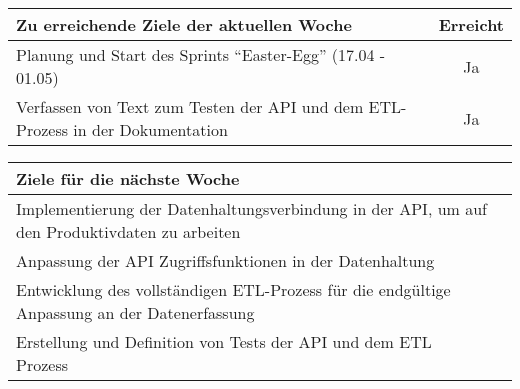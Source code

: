 \begin{tabularx}{\textwidth}{Xc}
    \arrayrulecolor{OliveGreen}
    \toprule
    {\bfseries Zu erreichende Ziele der aktuellen Woche} & {\bfseries Erreicht} \\
    \midrule[2pt]
    Planung und Start des Sprints ``Easter-Egg'' (17.04 - 01.05)  &  Ja  \\
    \rowcolor{OliveGreen!15}
    Verfassen von Text zum Testen der API und dem ETL-Prozess in der
    Dokumentation  &  Ja  \\
    \bottomrule[2pt]
\end{tabularx}
%
\vspace{1cm}
%
\begin{tabularx}{\textwidth}{Xc}
    \arrayrulecolor{OliveGreen}
    \toprule
    {\bfseries Ziele für die nächste Woche}              &                      \\
    \midrule[2pt]
    Implementierung der Datenhaltungsverbindung in der API, um auf den
    Produktivdaten zu arbeiten  &  \\
    \rowcolor{OliveGreen!15}
    Anpassung der API Zugriffsfunktionen in der Datenhaltung  &  \\
    \rowcolor{White}
    Entwicklung des vollständigen ETL-Prozess für die endgültige
    Anpassung an der Datenerfassung  &  \\
    \rowcolor{White}
    Erstellung und Definition von Tests der API und dem ETL Prozess  &  \\
\end{tabularx}

